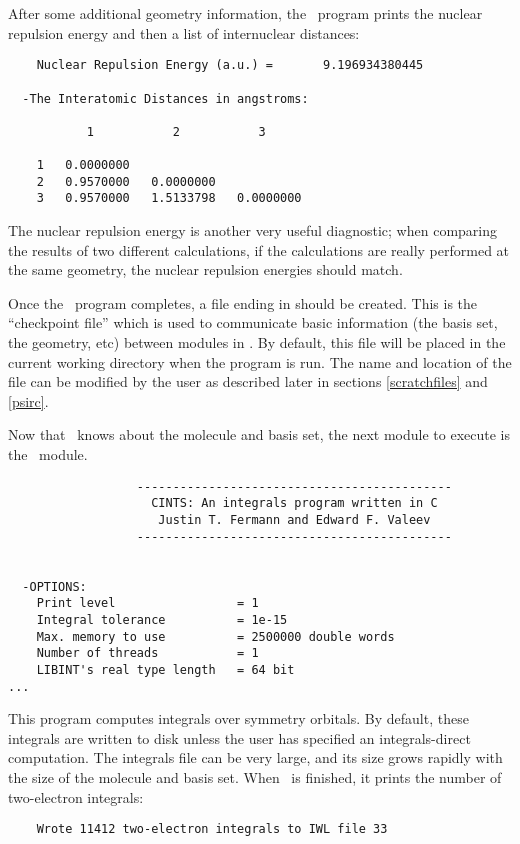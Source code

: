 After some additional geometry information, the \PSIinput\ program
prints the nuclear repulsion energy and then a list of internuclear
distances:
\begin{verbatim}
    Nuclear Repulsion Energy (a.u.) =       9.196934380445
                                                                                
  -The Interatomic Distances in angstroms:
                                                                                
           1           2           3
                                                                                
    1   0.0000000
    2   0.9570000   0.0000000
    3   0.9570000   1.5133798   0.0000000
\end{verbatim}

The nuclear repulsion energy is another very useful diagnostic; when
comparing the results of two different calculations, if the calculations
are really performed at the same geometry, the nuclear repulsion energies
should match.

Once the \PSIinput\ program completes, a file ending in  should
be created.  This is the ``checkpoint file'' which is used to communicate
basic information (the basis set, the geometry, etc) between modules
in \PSIthree.  By default, this file will be placed in the current working
directory when the program is run.  The name and location of the file can
be modified by the user as described later in sections \ref{scratchfiles}
and \ref{psirc}.

Now that \PSIthree\ knows about the molecule and basis set, the next
module to execute is the \PSIcints\ module.  
\begin{verbatim}
                  --------------------------------------------
                    CINTS: An integrals program written in C
                     Justin T. Fermann and Edward F. Valeev
                  --------------------------------------------
                                                                                
                                                                                
  -OPTIONS:
    Print level                 = 1
    Integral tolerance          = 1e-15
    Max. memory to use          = 2500000 double words
    Number of threads           = 1
    LIBINT's real type length   = 64 bit
...
\end{verbatim}
This program computes
integrals over symmetry orbitals.  By default, these integrals are
written to disk unless the user has specified an integrals-direct
computation.  The integrals file can be very large, and its size grows
rapidly with the size of the molecule and basis set.  When \PSIcints\ 
is finished, it prints the number of two-electron integrals:
\begin{verbatim}
    Wrote 11412 two-electron integrals to IWL file 33
\end{verbatim}

